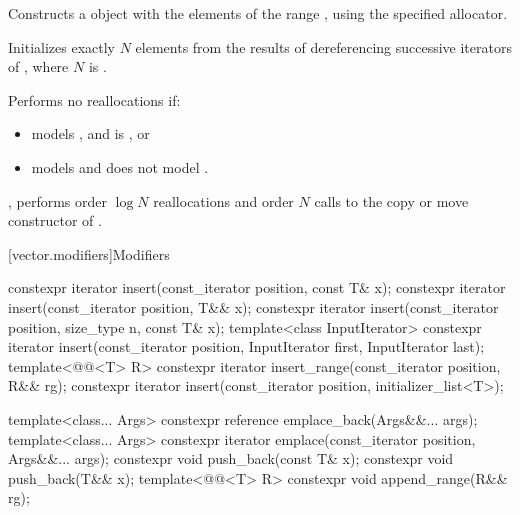 \documentclass{wg21}
\begin{document}
\begin{itemdescr}
    \pnum
    \effects
    Constructs a  object with the elements of the range ,
    using the specified allocator.

    \pnum
    \complexity
    Initializes exactly $N$ elements
    from the results of dereferencing successive iterators of ,
    where $N$ is .

\begin{addedblock}
    Performs no reallocations if:
    \begin{itemize}
    \item {} models , %
    and  is , or
    \item {} models  and
     does not model .
    \end{itemize}
\end{addedblock}
     , performs order $\log N$ reallocations and
    order $N$ calls to the copy or move constructor of .
\end{itemdescr}

[vector.modifiers]{Modifiers}

%
\begin{itemdecl}
constexpr iterator insert(const_iterator position, const T& x);
constexpr iterator insert(const_iterator position, T&& x);
constexpr iterator insert(const_iterator position, size_type n, const T& x);
template<class InputIterator>
constexpr iterator insert(const_iterator position, InputIterator first, InputIterator last);
template<@@<T> R>
constexpr iterator insert_range(const_iterator position, R&& rg);
constexpr iterator insert(const_iterator position, initializer_list<T>);

template<class... Args> constexpr reference emplace_back(Args&&... args);
template<class... Args> constexpr iterator emplace(const_iterator position, Args&&... args);
constexpr void push_back(const T& x);
constexpr void push_back(T&& x);
template<@@<T> R>
constexpr void append_range(R&& rg);
\end{itemdecl}
\end{document}
